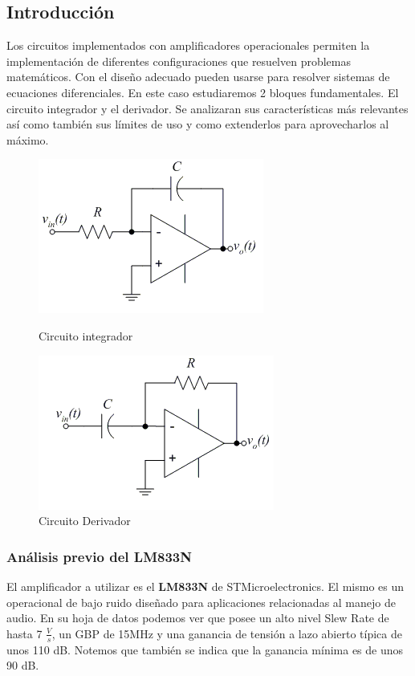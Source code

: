 \subsection{Introducción}
Los circuitos implementados con amplificadores operacionales permiten la implementación de diferentes configuraciones que resuelven problemas matemáticos. Con el diseño adecuado pueden usarse para resolver sistemas de ecuaciones diferenciales.
En este caso estudiaremos 2 bloques fundamentales. El circuito integrador y el derivador. Se analizaran sus características más relevantes así como también sus límites de uso y como extenderlos para aprovecharlos al máximo.

\begin{figure}[hbt!]
	\includegraphics[scale=1]{Ejercicio4/integrador.png}
	\caption{Circuito integrador} 
	
	\includegraphics{Ejercicio4/derivador}
	\caption{Circuito Derivador} 
	
\end{figure}

\subsubsection{Análisis previo del \textbf{LM833N}}
El amplificador a utilizar es el \textbf{LM833N} de STMicroelectronics. El mismo es un operacional de bajo ruido diseñado para aplicaciones relacionadas al manejo de audio.
En su hoja de datos podemos ver que posee un alto nivel Slew Rate de hasta 7 $\frac{V}{s}$, un GBP de 15MHz y una ganancia de tensión 
a lazo abierto típica de unos 110 dB. Notemos que también se indica que la ganancia mínima es de unos 90 dB. 


